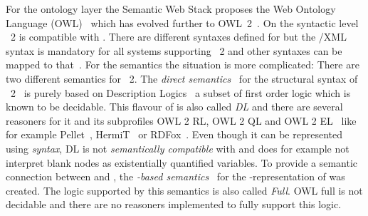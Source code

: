 For the ontology layer the Semantic Web Stack proposes the Web Ontology Language (OWL)~\cite{owlold} which has evolved further to OWL~2~\cite{owl}. 
On the syntactic level \owl~2 is compatible with \rdf. There are different syntaxes defined for \owl but the \rdf{}/XML syntax is mandatory for all 
systems supporting \owl~2 and other 
syntaxes can be mapped to that~\cite{owltordf}.
For the semantics the situation is more complicated: There are two different semantics for \owl~2. 
The \emph{direct semantics}~\cite{owldsem} for the structural syntax of \owl~2~\cite{owlsyn1} is purely based on Description Logics~\cite{dl} a subset of first order logic
which is known 
to be decidable.
This flavour of  is also called \emph{\owl DL} and there are several reasoners for it and its subprofiles OWL 2 RL, OWL 2 QL and OWL 2 EL~\cite{OWLRL}
like for example Pellet~\cite{Pellet}, HermiT~\cite{hermit} or RDFox~\cite{rdfox}.  
Even though it can be represented using \rdf \emph{syntax}, \owl DL is not \emph{semantically compatible} with \rdf and 
does for example not interpret blank nodes as existentially quantified variables.
To provide a semantic connection between \owl and \rdf, 
the \emph{\rdf-based semantics}~\cite{owlrdfsem} for the \rdf-representation of  was created. %
The logic supported by this semantics is also called \emph{\owl Full}. OWL full is not decidable and there are no reasoners implemented to fully support 
this logic. 

